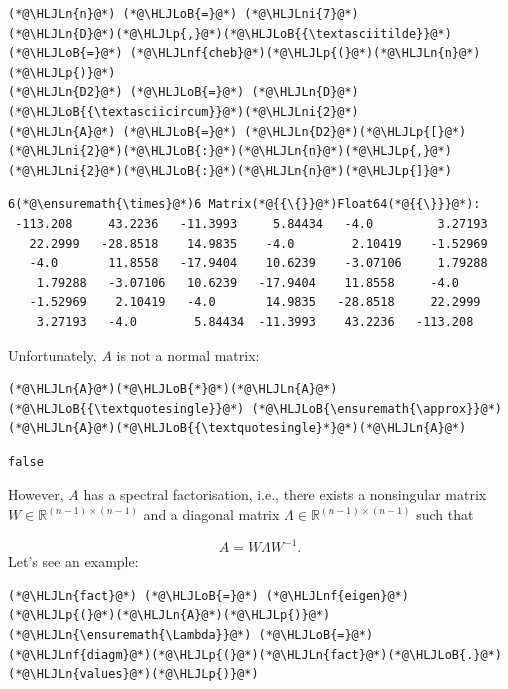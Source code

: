 \documentclass[12pt,a4paper]{article}
\newcommand{\HLJLn}[1]{#1}
\newcommand{\HLJLnf}[1]{\textcolor[RGB]{66,102,213}{#1}}
\newcommand{\HLJLni}[1]{\textcolor[RGB]{59,151,46}{#1}}
\newcommand{\HLJLoB}[1]{\textcolor[RGB]{102,102,102}{\textbf{#1}}}
\newcommand{\HLJLp}[1]{#1}
\begin{document}
\begin{lstlisting}
(*@\HLJLn{n}@*) (*@\HLJLoB{=}@*) (*@\HLJLni{7}@*)
(*@\HLJLn{D}@*)(*@\HLJLp{,}@*)(*@\HLJLoB{{\textasciitilde}}@*) (*@\HLJLoB{=}@*) (*@\HLJLnf{cheb}@*)(*@\HLJLp{(}@*)(*@\HLJLn{n}@*)(*@\HLJLp{)}@*)
(*@\HLJLn{D2}@*) (*@\HLJLoB{=}@*) (*@\HLJLn{D}@*)(*@\HLJLoB{{\textasciicircum}}@*)(*@\HLJLni{2}@*)
(*@\HLJLn{A}@*) (*@\HLJLoB{=}@*) (*@\HLJLn{D2}@*)(*@\HLJLp{[}@*)(*@\HLJLni{2}@*)(*@\HLJLoB{:}@*)(*@\HLJLn{n}@*)(*@\HLJLp{,}@*)(*@\HLJLni{2}@*)(*@\HLJLoB{:}@*)(*@\HLJLn{n}@*)(*@\HLJLp{]}@*)
\end{lstlisting}

\begin{lstlisting}
6(*@\ensuremath{\times}@*)6 Matrix(*@{{\{}}@*)Float64(*@{{\}}}@*):
 -113.208     43.2236   -11.3993     5.84434   -4.0         3.27193
   22.2999   -28.8518    14.9835    -4.0        2.10419    -1.52969
   -4.0       11.8558   -17.9404    10.6239    -3.07106     1.79288
    1.79288   -3.07106   10.6239   -17.9404    11.8558     -4.0
   -1.52969    2.10419   -4.0       14.9835   -28.8518     22.2999
    3.27193   -4.0        5.84434  -11.3993    43.2236   -113.208
\end{lstlisting}


Unfortunately, $A$ is not a normal matrix:


\begin{lstlisting}
(*@\HLJLn{A}@*)(*@\HLJLoB{*}@*)(*@\HLJLn{A}@*)(*@\HLJLoB{{\textquotesingle}}@*) (*@\HLJLoB{\ensuremath{\approx}}@*) (*@\HLJLn{A}@*)(*@\HLJLoB{{\textquotesingle}*}@*)(*@\HLJLn{A}@*)
\end{lstlisting}

\begin{lstlisting}
false
\end{lstlisting}


However, $A$ has a spectral factorisation, i.e., there exists a nonsingular matrix $W \in \mathbb{R}^{(n-1)\times (n-1)}$ and a diagonal matrix $\Lambda \in \mathbb{R}^{(n-1)\times (n-1)}$ such that

\[
A = W\Lambda W^{-1}.
\]
Let's see an example:


\begin{lstlisting}
(*@\HLJLn{fact}@*) (*@\HLJLoB{=}@*) (*@\HLJLnf{eigen}@*)(*@\HLJLp{(}@*)(*@\HLJLn{A}@*)(*@\HLJLp{)}@*)
(*@\HLJLn{\ensuremath{\Lambda}}@*) (*@\HLJLoB{=}@*) (*@\HLJLnf{diagm}@*)(*@\HLJLp{(}@*)(*@\HLJLn{fact}@*)(*@\HLJLoB{.}@*)(*@\HLJLn{values}@*)(*@\HLJLp{)}@*)
\end{lstlisting}
\end{document}
